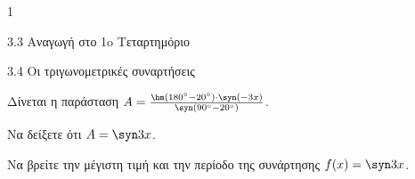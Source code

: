 \begin{ylh}{1}
\item 3.3 Αναγωγή στο 1o Τεταρτημόριο
\item 3.4 Οι τριγωνομετρικές συναρτήσεις
\end{ylh}
Δίνεται η παράσταση $A = \frac{\hm (180^{\circ} - 20^{\circ}) \cdot \syn (-3x)}{\syn (90^{\circ} - 20^{\circ})}$.
\begin{alist}
\item Να δείξετε ότι $A = \syn  3x$.
\item Να βρείτε την μέγιστη τιμή και την περίοδο της συνάρτησης $f(x) = \syn  3x$.
\end{alist}

